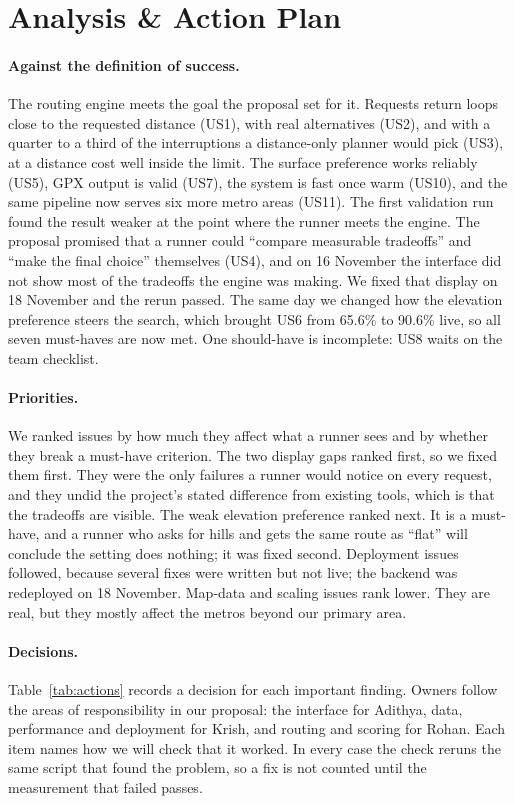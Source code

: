 \section{Analysis \& Action Plan}
\label{sec:analysis}

\paragraph{Against the definition of success.}
The routing engine meets the goal the proposal set for it. Requests return
loops close to the requested distance (US1), with real alternatives (US2), and
with a quarter to a third of the interruptions a distance-only planner would pick
(US3), at a distance cost well inside the limit. The surface preference works
reliably (US5), GPX output is valid (US7), the system is fast once warm
(US10), and the same pipeline now serves six more metro areas (US11). The
first validation run found the result weaker at the point where the runner
meets the engine. The proposal promised that a runner could ``compare
measurable tradeoffs'' and ``make the final choice'' themselves (US4), and on
16 November the interface did not show most of the tradeoffs the engine was
making. We fixed that display on 18 November and the rerun passed. The same
day we changed how the elevation preference steers the search, which brought
US6 from 65.6\% to 90.6\% live, so all seven must-haves are now met. One
should-have is incomplete: US8 waits on the team checklist.

\paragraph{Priorities.}
We ranked issues by how much they affect what a runner sees and by whether
they break a must-have criterion. The two display gaps ranked first, so we
fixed them first. They were the only failures a runner would notice on every
request, and they undid the project's stated difference from existing tools,
which is that the tradeoffs are visible. The weak elevation preference ranked
next. It is a must-have, and a runner who asks for hills and gets the same
route as ``flat'' will conclude the setting does nothing; it was fixed second.
Deployment issues followed, because several fixes were written but not live;
the backend was redeployed on 18 November. Map-data and scaling issues rank lower. They are
real, but they mostly affect the metros beyond our primary area.

\paragraph{Decisions.}
Table~\ref{tab:actions} records a decision for each important finding. Owners
follow the areas of responsibility in our proposal: the interface for
Adithya, data, performance and deployment for Krish, and routing and scoring
for Rohan. Each item names how we will check that it worked. In every case
the check reruns the same script that found the problem, so a fix is not
counted until the measurement that failed passes.

